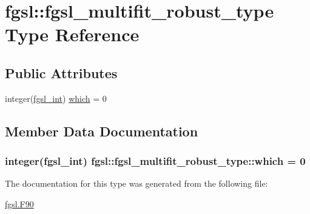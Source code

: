 \hypertarget{structfgsl_1_1fgsl__multifit__robust__type}{\section{fgsl\-:\-:fgsl\-\_\-multifit\-\_\-robust\-\_\-type Type Reference}
\label{structfgsl_1_1fgsl__multifit__robust__type}
}
\subsection*{Public Attributes}
\begin{DoxyCompactItemize}
\item 
integer(\hyperlink{classfgsl_a222deda1d7a0c0e845ce4a683318efeb}{fgsl\-\_\-int}) \hyperlink{structfgsl_1_1fgsl__multifit__robust__type_ae436e39370cab414b168cea8be3b534e}{which} = 0
\end{DoxyCompactItemize}


\subsection{Member Data Documentation}
\hypertarget{structfgsl_1_1fgsl__multifit__robust__type_ae436e39370cab414b168cea8be3b534e}{
\subsubsection[{which}]{\setlength{\rightskip}{0pt plus 5cm}integer({\bf fgsl\-\_\-int}) fgsl\-::fgsl\-\_\-multifit\-\_\-robust\-\_\-type\-::which = 0}}\label{structfgsl_1_1fgsl__multifit__robust__type_ae436e39370cab414b168cea8be3b534e}


The documentation for this type was generated from the following file\-:\begin{DoxyCompactItemize}
\item 
\hyperlink{fgsl_8F90}{fgsl.\-F90}\end{DoxyCompactItemize}
